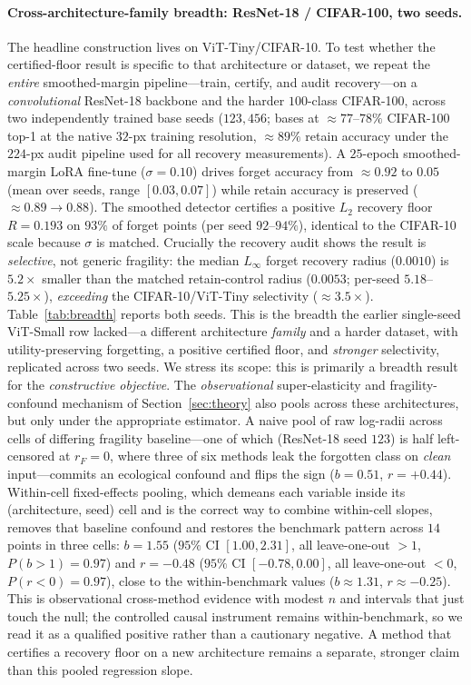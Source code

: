 \documentclass[11pt]{article}
\begin{document}
\paragraph{Cross-architecture-family breadth: ResNet-18 / CIFAR-100, two seeds.}
The headline construction lives on ViT-Tiny/CIFAR-10. To test whether the
certified-floor result is specific to that architecture or dataset, we repeat the
\emph{entire} smoothed-margin pipeline---train, certify, and audit recovery---on a
\emph{convolutional} ResNet-18 backbone and the harder $100$-class CIFAR-100,
across two independently trained base seeds ($123,456$; bases at
$\approx\!77$--$78\%$ CIFAR-100 top-1 at the native $32$-px training resolution,
$\approx\!89\%$ retain accuracy under the $224$-px audit pipeline used for all
recovery measurements). A $25$-epoch smoothed-margin LoRA fine-tune
($\sigma=0.10$) drives forget accuracy from $\approx\!0.92$ to $0.05$ (mean over
seeds, range $[0.03,0.07]$) while retain accuracy is preserved
($\approx\!0.89\!\to\!0.88$). The smoothed detector certifies a positive $L_2$
recovery floor $R=0.193$ on $93\%$ of forget points (per seed $92$--$94\%$),
identical to the CIFAR-10 scale because $\sigma$ is matched. Crucially the
recovery audit shows the result is \emph{selective}, not generic fragility: the
median $L_\infty$ forget recovery radius ($0.0010$) is $5.2\times$ smaller than
the matched retain-control radius ($0.0053$; per-seed $5.18$--$5.25\times$),
\emph{exceeding} the CIFAR-10/ViT-Tiny selectivity ($\approx\!3.5\times$).
Table~\ref{tab:breadth} reports both seeds. This is the breadth the earlier
single-seed ViT-Small row lacked---a different architecture \emph{family} and a
harder dataset, with utility-preserving forgetting, a positive certified floor,
and \emph{stronger} selectivity, replicated across two seeds. We stress its
scope: this is primarily a breadth result for the \emph{constructive objective}.
The \emph{observational} super-elasticity and fragility-confound mechanism of
Section~\ref{sec:theory} also pools across these architectures, but only under the
appropriate estimator. A naive pool of raw log-radii across cells of differing
fragility baseline---one of which (ResNet-18 seed $123$) is half left-censored at
$r_F{=}0$, where three of six methods leak the forgotten class on \emph{clean}
input---commits an ecological confound and flips the sign ($b{=}0.51$,
$r{=}{+}0.44$). Within-cell fixed-effects pooling, which demeans each variable
inside its (architecture, seed) cell and is the correct way to combine within-cell
slopes, removes that baseline confound and restores the benchmark pattern across
$14$ points in three cells: $b{=}1.55$ ($95\%$ CI $[1.00,2.31]$, all
leave-one-out $>1$, $P(b{>}1){=}0.97$) and $r{=}{-}0.48$ ($95\%$ CI
$[-0.78,0.00]$, all leave-one-out $<0$, $P(r{<}0){=}0.97$), close to the
within-benchmark values ($b{\approx}1.31$, $r{\approx}{-}0.25$). This is
observational cross-method evidence with modest $n$ and intervals that just touch
the null; the controlled causal instrument remains within-benchmark, so we read it
as a qualified positive rather than a cautionary negative. A method that certifies
a recovery floor on a new architecture remains a separate, stronger claim than this
pooled regression slope.
\end{document}
